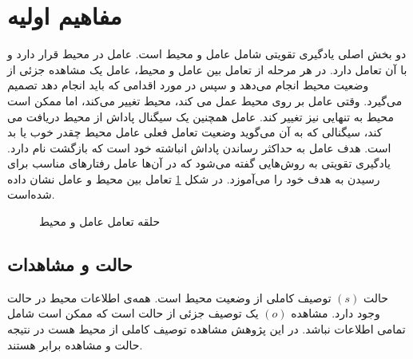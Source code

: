 \section{مفاهیم اولیه}
دو بخش اصلی یادگیری تقویتی
شامل عامل
 و محیط
  است. عامل در محیط قرار دارد و با آن تعامل دارد.
  در هر مرحله از تعامل بین عامل و محیط، عامل یک مشاهده جزئی از وضعیت محیط انجام می‌دهد و سپس در مورد اقدامی که باید انجام دهد تصمیم می‌گیرد. وقتی عامل بر روی محیط عمل می کند، محیط تغییر می‌کند، اما ممکن است محیط به تنهایی نیز تغییر کند.
  عامل همچنین یک سیگنال پاداش
   از محیط دریافت می کند، سیگنالی که به آن می‌گوید وضعیت تعامل فعلی عامل محیط چقدر خوب یا بد است. هدف عامل به حداکثر رساندن پاداش انباشته خود است که بازگشت
    نام دارد. یادگیری تقویتی به روش‌هایی گفته می‌شود که در آن‌ها عامل رفتارهای مناسب برای رسیدن به هدف خود را می‌آموزد. در شکل
    \ref{fig:agent_env}
    تعامل بین محیط و عامل نشان داده شده‌است.
\begin{figure}[H]
	\begin{center}
	\end{center}
	\caption{حلقه تعامل عامل و محیط}
	\label{fig:agent_env}
\end{figure}
\subsection{حالت و مشاهدات}
حالت
\((s)\)
 توصیف کاملی از وضعیت محیط است. همه‌ی اطلاعات محیط در حالت وجود دارد. مشاهده
 \((o)\)
  یک توصیف جزئی از حالت است که ممکن است شامل تمامی اطلاعات نباشد. در این پژوهش مشاهده توصیف کاملی از محیط هست در نتیجه حالت و مشاهده برابر هستند.
